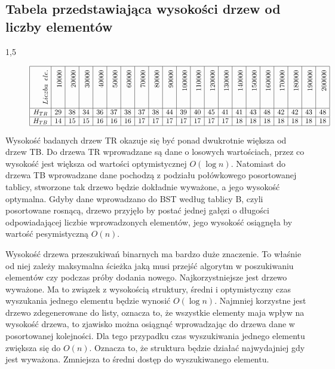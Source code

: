 \documentclass[polish,polish,a4paper]{article}
\begin{document}
\subsection*{Tabela przedstawiająca wysokości drzew od liczby elementów}
\begin{spacing}{1,5}
\begin{figure}[H]

	\centering
	\begin{equation*}
	\begin{array}{|r|r|r|r|r|r|r|r|r|r|r|r|r|r|r|r|r|r|r|r|r|}
	\hline
\rotatebox[origin=r]{90}{$ \enskip Liczba\enskip ele.$}&\rotatebox[origin=r]{90}{10000}&\rotatebox[origin=r]{90}{20000}&\rotatebox[origin=r]{90}{30000}&\rotatebox[origin=r]{90}{40000}&\rotatebox[origin=r]{90}{50000}&\rotatebox[origin=r]{90}{60000}&\rotatebox[origin=r]{90}{70000}&\rotatebox[origin=r]{90}{80000}&\rotatebox[origin=r]{90}{90000}&\rotatebox[origin=r]{90}{100000}&\rotatebox[origin=r]{90}{110000}&\rotatebox[origin=r]{90}{120000}&\rotatebox[origin=r]{90}{130000}&\rotatebox[origin=r]{90}{140000}&\rotatebox[origin=r]{90}{150000}&\rotatebox[origin=r]{90}{160000}&\rotatebox[origin=r]{90}{170000}&\rotatebox[origin=r]{90}{180000}&\rotatebox[origin=r]{90}{190000}&\rotatebox[origin=r]{90}{200000}\\\hline
H_{TR}&29&38&34&36&37&38&37&38&44&39&40&45&41&41&43&48&42&42&43&48\\\hline
H_{TB}&14&15&15&16&16&16&17&17&17&17&17&17&17&18&18&18&18&18&18&18\\\hline



	\end{array}
	\end{equation*}
\end{figure}
\end{spacing}

Wysokość badanych drzew TR okazuje się być ponad dwukrotnie większa od drzew TB. Do drzewa TR wprowadzane są dane o losowych wartościach, przez co wysokość jest większa od wartości optymistycznej $O(\log n )$. Natomiast do drzewa TB wprowadzane dane pochodzą z podziału połówkowego posortowanej tablicy, stworzone tak drzewo będzie dokładnie wyważone, a jego wysokość optymalna.
Gdyby dane wprowadzano do BST według tablicy B, czyli posortowane rosnącą, drzewo przyjęło by postać jednej gałęzi o długości odpowiadającej liczbie wprowadzonych elementów, jego wysokość osiągnęła by wartość pesymistyczną $ O(n) $.

Wysokość drzewa przeszukiwań binarnych ma bardzo duże znaczenie. To właśnie od niej zależy maksymalna ścieżka jaką musi przejść algorytm w poszukiwaniu elementów czy  podczas próby dodania nowego. 
Najkorzystniejsze jest drzewo wyważone. Ma to związek z wysokością struktury, średni i optymistyczny czas wyszukania jednego elementu będzie wynosić $O(\log n)$. Najmniej korzystne jest drzewo zdegenerowane do listy, oznacza to, że wszystkie elementy maja wpływ na wysokość drzewa, to zjawisko można osiągnąć wprowadzając do drzewa dane w posortowanej kolejności. Dla tego przypadku czas wyszukiwania jednego elementu zwiększa się do $ O(n) $. Oznacza to, że struktura będzie działać najwydajniej gdy jest wyważona. Zmniejsza to średni dostęp do wyszukiwanego elementu.
\end{document}
